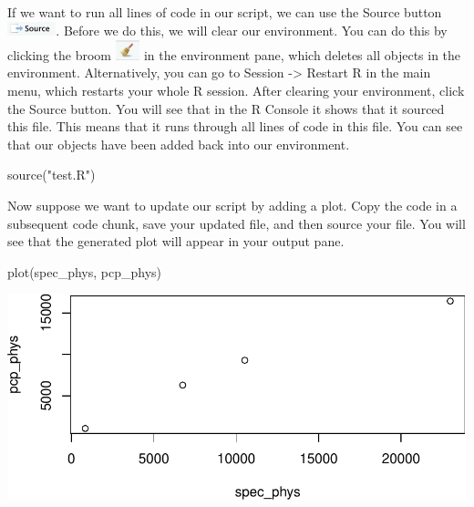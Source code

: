 \documentclass[
  letterpaper,
]{latex/krantz}
\makeatletter
\newenvironment{Shaded}{\begin{snugshade}}{\end{snugshade}}
\newcommand{\FunctionTok}[1]{\textcolor[rgb]{0.28,0.35,0.67}{#1}}
\newcommand{\NormalTok}[1]{\textcolor[rgb]{0.00,0.23,0.31}{#1}}
\newcommand{\StringTok}[1]{\textcolor[rgb]{0.13,0.47,0.30}{#1}}
\newenvironment{kframe}{%
\medskip{}
\setlength{\fboxsep}{.8em}
 \def\at@end@of@kframe{}%
 \ifinner\ifhmode%
  \def\at@end@of@kframe{\end{minipage}}%
  \begin{minipage}{\columnwidth}%
 \fi\fi%
 \def\FrameCommand##1{\hskip\@totalleftmargin \hskip-\fboxsep
 \colorbox{shadecolor}{##1}\hskip-\fboxsep
     \hskip-\linewidth \hskip-\@totalleftmargin \hskip\columnwidth}%
 \MakeFramed {\advance\hsize-\width
   \@totalleftmargin\z@ \linewidth\hsize
   \@setminipage}}%
 {\par\unskip\endMakeFramed%
 \at@end@of@kframe}
\renewenvironment{Shaded}{\begin{kframe}}{\end{kframe}}
\makeatother
\begin{document}
If we want to run all lines of code in our script, we can use the Source
button
\includegraphics[width=0.55556in,height=\textheight]{book/images/intro_to_r/source.png}.
Before we do this, we will clear our environment. You can do this by
clicking the broom
\includegraphics[width=0.27778in,height=\textheight]{book/images/intro_to_r/broom.png}
in the environment pane, which deletes all objects in the environment.
Alternatively, you can go to Session -\textgreater{} Restart R in the
main menu, which restarts your whole R session. After clearing your
environment, click the Source button. You will see that in the R Console
it shows that it sourced this file. This means that it runs through all
lines of code in this file. You can see that our objects have been added
back into our environment.

\begin{Shaded}
\begin{Highlighting}[]
\FunctionTok{source}\NormalTok{(}\StringTok{"test.R"}\NormalTok{)}
\end{Highlighting}
\end{Shaded}

Now suppose we want to update our script by adding a plot. Copy the code
in a subsequent code chunk, save your updated file, and then source your
file. You will see that the generated plot will appear in your output
pane.

\begin{Shaded}
\begin{Highlighting}[]
\FunctionTok{plot}\NormalTok{(spec\_phys, pcp\_phys)}
\end{Highlighting}
\end{Shaded}

\begin{center}
\includegraphics[width=1\textwidth,height=\textheight]{book/intro_to_r_files/figure-pdf/unnamed-chunk-5-1.pdf}
\end{center}
\end{document}
